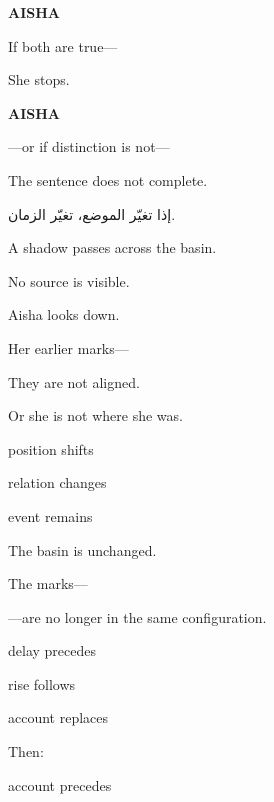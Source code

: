 \textbf{AISHA}

If both are true---

\medskip

She stops.

\medskip

\textbf{AISHA}

---or if  distinction is not---

\medskip

The sentence does not complete.

\medskip

\begin{AR}
إذا تغيّر الموضع، تغيّر الزمان.
\end{AR}

\medskip

A shadow passes across the basin.

\medskip

No source is visible.

\medskip


\medskip

Aisha looks down.

Her earlier marks---

\medskip

They are not aligned.

\medskip

Or she is not where she was.

\medskip

 position shifts

 relation changes

 event remains

\medskip

The basin is unchanged.

\medskip

The marks---

\medskip

---are no longer in the same configuration.

\medskip

 delay precedes

 rise follows

 account replaces

\medskip

Then:

\medskip

 account precedes

